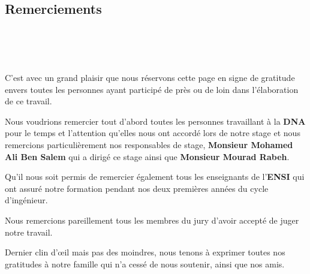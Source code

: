 \renewcommand{\abstractnamefont}{\normalfont\Large\bfseries}


\hskip7mm

\vspace{\fill}
\begin{center}
\section*{Remerciements}
\end{center}
~~\\
~~\\
~~\\
\begin{spacing}{1.3}
C'est avec un grand plaisir que nous réservons cette page en signe de gratitude envers toutes les personnes ayant participé de près ou de loin dans l'élaboration de ce travail.\\
\end{spacing}
\begin{spacing}{1.3}
Nous voudrions remercier tout d'abord toutes les personnes travaillant à la \textbf{DNA} pour le temps et l’attention qu’elles nous ont accordé lors de notre stage et nous remercions  particulièrement nos responsables de stage,\textbf{ Monsieur Mohamed Ali Ben Salem}  qui a dirigé ce stage ainsi que \textbf{Monsieur Mourad Rabeh}.\\
\end{spacing}
\begin{spacing}{1.3}
Qu'il nous soit permis de remercier également tous les enseignants de l'\textbf{ENSI} qui ont assuré notre formation pendant nos deux premières années du cycle d’ingénieur.\\
\end{spacing}
\begin{spacing}{1.3}
Nous remercions pareillement tous les membres du jury d’avoir accepté de juger notre travail. \\
\end{spacing}
\begin{spacing}{1.3}
Dernier clin d'œil mais pas des moindres, nous tenons à exprimer toutes nos gratitudes à notre famille qui n'a cessé de nous soutenir, ainsi que nos amis. \\
\end{spacing}
\vspace{\fill}





